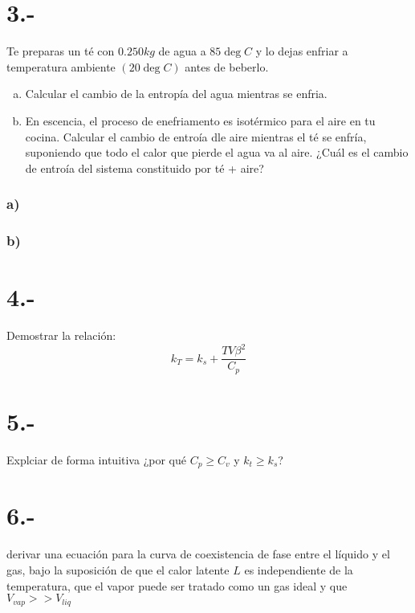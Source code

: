\documentclass{article}
\begin{document}
\section*{3.-}
Te preparas un té con $0.250kg$ de agua a $85 \deg C$ y lo dejas enfriar a temperatura ambiente
$(20\deg C)$ antes de beberlo.
\begin{enumerate}[a)]
    \item Calcular el cambio de la entropía del agua mientras se enfria.
    \item En escencia, el proceso de enefriamento es isotérmico para el aire en tu cocina. Calcular el cambio 
    de entroía dle aire mientras el té se enfría, suponiendo que todo el calor que pierde el agua va al aire.
    ¿Cuál es el cambio de entroía del sistema constituido por té + aire?
\end{enumerate}
\begin{tcolorbox}[breakable]
    \subsubsection*{a)}

    \subsubsection*{b)}
\end{tcolorbox}

\section*{4.-}
Demostrar la relación:
\[ k_T = k_s + \frac{TV\beta^2}{C_p} \]
\begin{tcolorbox}[breakable]

\end{tcolorbox}

\section*{5.-}
Explciar de forma intuitiva ¿por qué $C_p \geq C_v$ y $k_t \geq k_s$?
\begin{tcolorbox}[breakable]

\end{tcolorbox}

\section*{6.-}
derivar una ecuación para la curva de coexistencia de fase entre el líquido y el gas, bajo la suposición de que el calor latente 
$L$ es independiente de la temperatura, que el vapor puede ser tratado como un gas ideal y que $V_{vap} >> V_{liq}$
\begin{tcolorbox}[breakable]

\end{tcolorbox}
\end{document}
